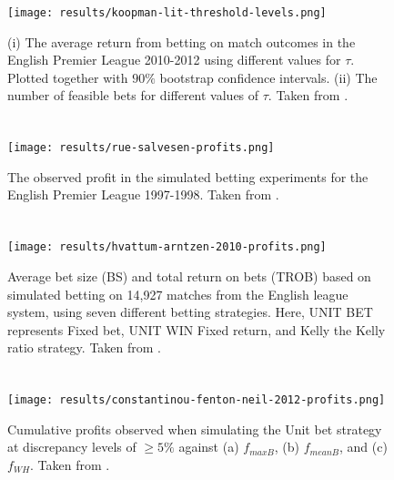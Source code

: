 \begin{figure}[H]
    \centering
    \texttt{[image: results/koopman-lit-threshold-levels.png]}
    \caption{(i) The average return from betting on match outcomes in the English Premier League 2010-2012 using different values for $\tau$. Plotted together with $90\%$ bootstrap confidence intervals. (ii) The number of feasible bets for different values of $\tau$. Taken from \citet{bib:koopman-lit-2015}.}
    \label{fig:app-koopman-lit-threshold-levels}
\end{figure}


\section{\citet{bib:rue-salvesen-2000}}

\begin{figure}[H]
    \centering
    \texttt{[image: results/rue-salvesen-profits.png]}
    \caption{The observed profit in the simulated betting experiments for the English Premier League 1997-1998. Taken from \citet{bib:rue-salvesen-2000}.}
    \label{fig:app-rue-salvesen-profits}
\end{figure}


\section{\citet{bib:hvattum-arntzen-2010}}

\begin{figure}[H]
    \centering
    \texttt{[image: results/hvattum-arntzen-2010-profits.png]}
    \caption{Average bet size (BS) and total return on bets (TROB) based on simulated betting on 14,927 matches from the English league system, using seven different betting strategies. Here, UNIT BET represents Fixed bet, UNIT WIN Fixed return, and Kelly the Kelly ratio strategy. Taken from \citet{bib:hvattum-arntzen-2010}.}
    \label{fig:app-hvattum-arntzen-2010-profits}
\end{figure}


\section{\citet{bib:constantinou-fenton-neil-2012}}

\begin{figure}[H]
    \centering
    \texttt{[image: results/constantinou-fenton-neil-2012-profits.png]}
    \caption{Cumulative profits observed when simulating the Unit bet strategy at discrepancy levels of $\geq 5\%$ against (a) $f_{maxB}$, (b) $f_{meanB}$, and (c) $f_{WH}$. Taken from \citet{bib:constantinou-fenton-neil-2012}.}
    \label{fig:app-constantinou-fenton-neil-2012-profits}
\end{figure}

